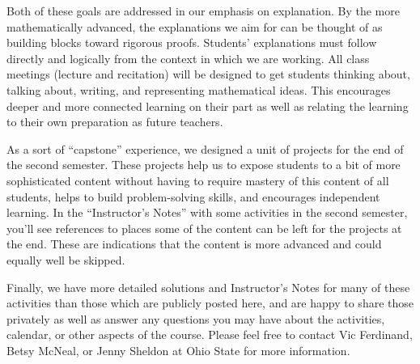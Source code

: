 \documentclass{ximera}
\begin{document}
Both of these goals are addressed in our emphasis on explanation.  By the more mathematically 
advanced, the explanations we aim for can be thought of as building blocks toward rigorous proofs.  
Students' explanations must follow directly and logically from the context in which we are working.  
All class meetings (lecture and recitation) will be designed to get students thinking about, talking 
about, writing, and representing mathematical ideas.  This encourages deeper and more connected 
learning on their part as well as relating the learning to their own preparation as future teachers.  

As a sort of ``capstone'' experience, we designed a unit of projects for the end of the second 
semester.  These projects help us to expose students to a bit of more sophisticated content without 
having to require mastery of this content of all students, helps to build problem-solving skills, and 
encourages independent learning.  In the ``Instructor's Notes'' with some activities in the second 
semester, you'll see references to places some of the content can be left for the projects at the end. 
These are indications that the content is more advanced and could equally well be skipped.

Finally, we have more detailed solutions and Instructor's Notes for many of these activities than those 
which are publicly posted here, and are happy to share those privately as well as answer any 
questions you may have about the activities, calendar, or other aspects of the course.  Please feel 
free to contact Vic Ferdinand, Betsy McNeal, or Jenny Sheldon at Ohio State for more information.
\end{document}
